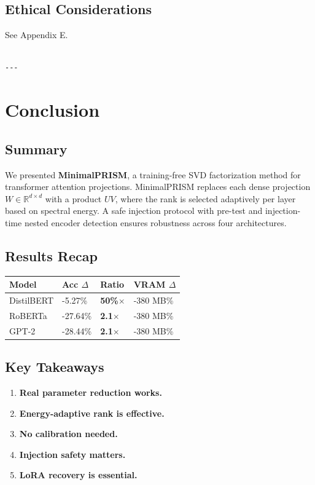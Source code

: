 \subsection{Ethical Considerations}

See Appendix E.
\begin{lstlisting}

---
\end{lstlisting}


\section{Conclusion}

\subsection{Summary}

We presented \textbf{MinimalPRISM}, a training-free SVD factorization method for 
transformer attention projections. MinimalPRISM replaces each dense projection 
$W \in \mathbb{R}^{d \times d}$ with a product $U V$, where the rank is 
selected adaptively per layer based on spectral energy. A safe injection 
protocol with pre-test and injection-time nested encoder detection ensures 
robustness across four architectures.

\subsection{Results Recap}

\begin{table}[H]
\centering
\small
\begin{tabular}{llll}
\toprule
\textbf{Model} & \textbf{Acc $\Delta$} & \textbf{Ratio} & \textbf{VRAM $\Delta$} \\
\midrule
DistilBERT & -5.27\% & \textbf{50\%$\times$} & -380 MB\% \\
RoBERTa & -27.64\% & \textbf{2.1$\times$} & -380 MB\% \\
GPT-2 & -28.44\% & \textbf{2.1$\times$} & -380 MB\% \\
\bottomrule
\end{tabular}
\end{table}

\subsection{Key Takeaways}

\begin{enumerate}
\item \textbf{Real parameter reduction works.}
\item \textbf{Energy-adaptive rank is effective.}
\item \textbf{No calibration needed.}
\item \textbf{Injection safety matters.}
\item \textbf{LoRA recovery is essential.}

\end{enumerate}
